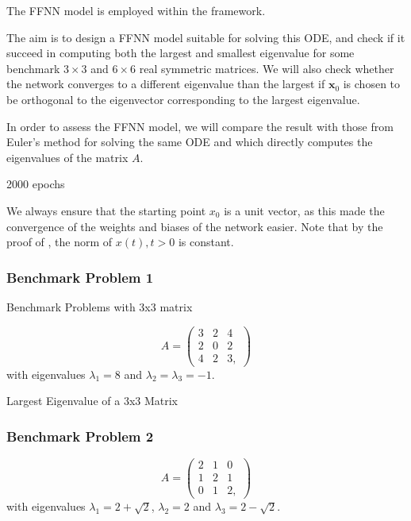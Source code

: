 The FFNN model is employed within the  framework.


The aim is to design a FFNN model suitable for solving this ODE, and check if it succeed in computing both the largest and smallest eigenvalue for some benchmark $3\times 3$ and $6\times 6$ real symmetric matrices. We will also check whether the network converges to a different eigenvalue than the largest if $\mathbf{x}_0$ is chosen to be orthogonal to the eigenvector corresponding to the largest eigenvalue. 

In order to assess the FFNN model, we will compare the result with those from Euler's method for solving the same ODE and   which directly computes the eigenvalues of the matrix $A$.

2000 epochs

We always ensure that the starting point $x_0$ is a unit vector, as this made the convergence of the weights and biases of the network easier. Note that by the proof of \cite[Theorem 2]{yfh04}, the norm of $x(t),t>0$ is constant.

\subsubsection{Benchmark Problem 1}\label{sec:benchmark problem 1}
Benchmark Problems with 3x3 matrix

\begin{equation}\label{eq:33mat}
    A = \left(\begin{array}{ccc}
        3 & 2 & 4  \\
        2 & 0 & 2  \\
        4 & 2 & 3,
    \end{array}\right)
\end{equation}
with eigenvalues $\lambda_1 = 8$ and $\lambda_2 = \lambda_3 = -1$.

Largest Eigenvalue of a 3x3 Matrix

\subsubsection{Benchmark Problem 2}\label{sec:benchmark problem 2}
\begin{equation}\label{eq:33mat2}
    A = \left(\begin{array}{ccc}
        2 & 1 & 0 \\
        1 & 2 & 1 \\
        0 & 1 & 2,
    \end{array}\right)
\end{equation}
with eigenvalues $\lambda_1 = 2+\sqrt{2}$, $\lambda_2 = 2$ and $\lambda_3 = 2-\sqrt{2}$.

